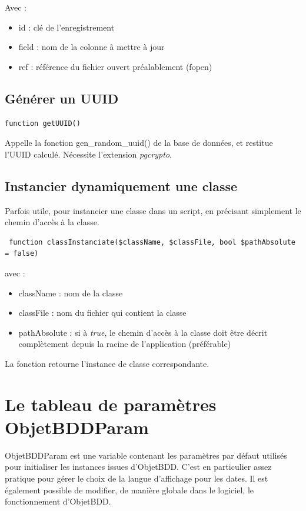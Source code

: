 Avec :
\begin{itemize}
	\item id : clé de l'enregistrement
	\item field : nom de la colonne à mettre à jour
	\item ref : référence du fichier ouvert préalablement (fopen)
\end{itemize}

\subsection{Générer un UUID}
\begin{lstlisting}
function getUUID()
\end{lstlisting}

Appelle la fonction gen\_random\_uuid() de la base de données, et restitue l'UUID calculé. Nécessite l'extension \textit{pgcrypto}.

\subsection{Instancier dynamiquement une classe}

Parfois utile, pour instancier une classe dans un script, en précisant simplement le chemin d'accès à la classe.

\begin{lstlisting}
 function classInstanciate($className, $classFile, bool $pathAbsolute = false)
\end{lstlisting}

avec : 
\begin{itemize}
	\item className : nom de la classe
	\item classFile : nom du fichier qui contient la classe
	\item pathAbsolute : si à \textit{true}, le chemin d'accès à la classe doit être décrit complètement depuis la racine de l'application (préférable)
\end{itemize}

La fonction retourne l'instance de classe correspondante.

\section{Le tableau de paramètres ObjetBDDParam}\label{objetbddparam}

ObjetBDDParam est une variable contenant les paramètres par défaut utilisés pour initialiser les instances issues d'ObjetBDD. C'est en particulier assez pratique pour gérer le choix de la langue d'affichage pour les dates. Il est également possible de modifier, de manière globale dans le logiciel, le fonctionnement d'ObjetBDD.

